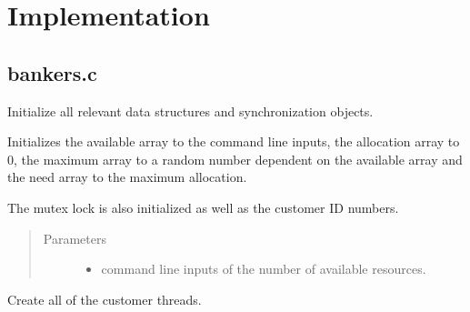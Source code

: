 \documentclass[letterpaper,10pt,english,openany,oneside]{sphinxmanual}
\begin{document}
\chapter{Implementation}
\label{\detokenize{source_code:implementation}}\label{\detokenize{source_code::doc}}

\section{bankers.c}
\label{\detokenize{source_code:bankers-c}}

\begin{fulllineitems}
Initialize all relevant data structures and synchronization objects.

Initializes the available array to the command line inputs, the
allocation array to 0, the maximum array to a random number dependent on the
available array and the need array to the maximum \sphinxhyphen{} allocation.

The mutex lock is also initialized as well as the customer ID numbers.
\begin{quote}\begin{description}
\item[{Parameters}] \leavevmode\begin{itemize}
\item {} 
 \textendash{} command line inputs of the number of available resources.

\end{itemize}

\end{description}\end{quote}

\end{fulllineitems}


\begin{fulllineitems}
\label{\detokenize{source_code:c.create_customers}}%
\pysigstartmultiline
{}%
\pysigstopmultiline
Create all of the customer threads.

\end{fulllineitems}
\end{document}
